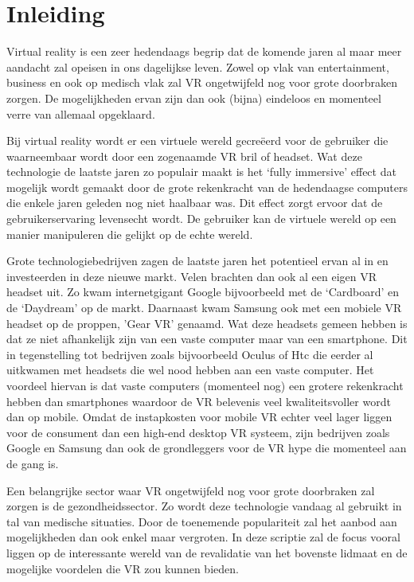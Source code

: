 
\chapter{Inleiding}
\label{ch:inleiding}

Virtual reality is een zeer hedendaags begrip dat de komende jaren al maar meer aandacht zal opeisen in ons dagelijkse leven. Zowel op vlak van entertainment, business en ook op medisch vlak zal VR ongetwijfeld nog voor grote doorbraken zorgen. De mogelijkheden ervan zijn dan ook (bijna) eindeloos en momenteel verre van allemaal opgeklaard.

Bij virtual reality wordt er een virtuele wereld gecreëerd voor de gebruiker die waarneembaar wordt door een zogenaamde VR bril of headset. Wat deze technologie de laatste jaren zo populair maakt is het ‘fully immersive’ effect dat mogelijk wordt gemaakt door de grote rekenkracht van de hedendaagse computers die enkele jaren geleden nog niet haalbaar was. Dit effect zorgt ervoor dat de gebruikerservaring levensecht wordt. De gebruiker kan de virtuele wereld op een manier manipuleren die gelijkt op de echte wereld. 

Grote technologiebedrijven zagen de laatste jaren het potentieel ervan al in en investeerden in deze nieuwe markt. Velen brachten dan ook al een eigen VR headset uit. Zo kwam internetgigant Google bijvoorbeeld met de ‘Cardboard’ en de ‘Daydream’ op de markt. Daarnaast kwam Samsung ook met een mobiele VR headset op de proppen, 'Gear VR’ genaamd. Wat deze headsets gemeen hebben is dat ze niet afhankelijk zijn van een vaste computer maar van een smartphone. Dit in tegenstelling tot bedrijven zoals bijvoorbeeld Oculus of Htc die eerder al uitkwamen met headsets die wel nood hebben aan een vaste computer. Het voordeel hiervan is dat vaste computers (momenteel nog) een grotere rekenkracht hebben dan smartphones waardoor de VR belevenis veel kwaliteitsvoller wordt dan op mobile. Omdat de instapkosten voor mobile VR echter veel lager liggen voor de consument dan een high-end desktop VR systeem, zijn bedrijven zoals Google en Samsung dan ook de grondleggers voor de VR hype die momenteel aan de gang is.

Een belangrijke sector waar VR ongetwijfeld nog voor grote doorbraken zal zorgen is de gezondheidssector. Zo wordt deze technologie vandaag al gebruikt in tal van medische situaties. Door de toenemende populariteit zal het aanbod aan mogelijkheden dan ook enkel maar vergroten. In deze scriptie zal de focus vooral liggen op de interessante wereld van de revalidatie van het bovenste lidmaat en de mogelijke voordelen die VR zou kunnen bieden.


